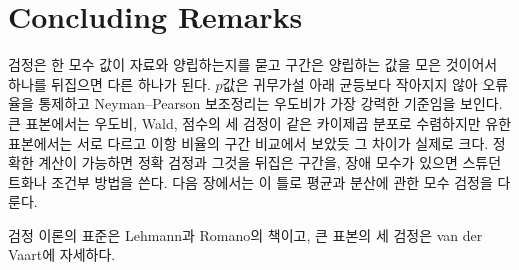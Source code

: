 \section{Concluding Remarks}

검정은 한 모수 값이 자료와 양립하는지를 묻고 구간은 양립하는 값을 모은 것이어서 하나를 뒤집으면 다른 하나가 된다. $p$값은 귀무가설 아래 균등보다 작아지지 않아 오류율을 통제하고 Neyman--Pearson 보조정리는 우도비가 가장 강력한 기준임을 보인다. 큰 표본에서는 우도비, Wald, 점수의 세 검정이 같은 카이제곱 분포로 수렴하지만 유한 표본에서는 서로 다르고 이항 비율의 구간 비교에서 보았듯 그 차이가 실제로 크다. 정확한 계산이 가능하면 정확 검정과 그것을 뒤집은 구간을, 장애 모수가 있으면 스튜던트화나 조건부 방법을 쓴다. 다음 장에서는 이 틀로 평균과 분산에 관한 모수 검정을 다룬다.

검정 이론의 표준은 Lehmann과 Romano의 책\cite{lehmann2005}이고, 큰 표본의 세 검정은 van der Vaart\cite{vandervaart1998}에 자세하다.

\chapterreferences
